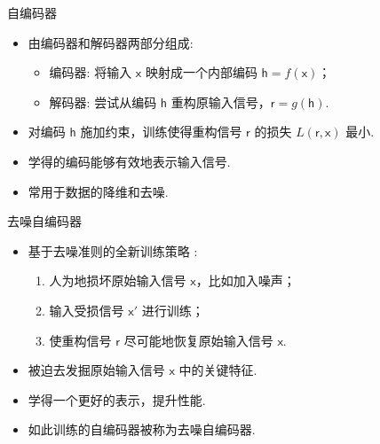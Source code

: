 \documentclass{beamer}
\newcommand{\B}[1]{\bm{\mathsf{#1}}}  %
\begin{document}
\begin{frame}{自编码器}
  \begin{itemize}
    \item 由\alert{编码器}和\alert{解码器}两部分组成:
      \begin{itemize}
        \item 编码器: 将输入 $\B{x}$ 映射成一个内部编码 $\B{h} = f(\B{x})$；
        \item 解码器: 尝试从编码 $\B{h}$ 重构原输入信号，$\B{r} = g(\B{h})$.
      \end{itemize}
    \item 对编码 $\B{h}$ 施加约束，训练使得重构信号 $\B{r}$ 的损失
      $L(\B{r}, \B{x})$ 最小.
    \item 学得的编码能够有效地表示输入信号.
    \item 常用于数据的降维和去噪.
  \end{itemize}

\end{frame}

\begin{frame}{去噪自编码器}
  \begin{itemize}
    \item 基于\alert{去噪准则}的全新训练策略 \cite{vincent2008,vincent2010}:
      \begin{enumerate}
        \item 人为地损坏原始输入信号 $\B{x}$，比如加入噪声；
        \item 输入受损信号 $\B{x}'$ 进行训练；
        \item 使重构信号 $\B{r}$ 尽可能地恢复原始输入信号 $\B{x}$.
      \end{enumerate}
    \item 被迫去发掘原始输入信号 $\B{x}$ 中的关键特征.
    \item 学得一个更好的表示，提升性能.
    \item 如此训练的自编码器被称为\alert{去噪自编码器}.
  \end{itemize}
\end{frame}
\end{document}
